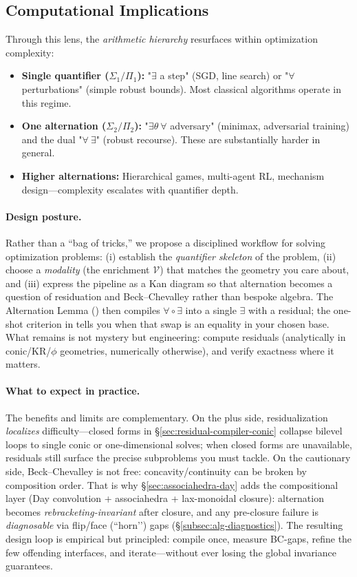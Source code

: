 \documentclass[11pt]{article}
\numberwithin{equation}{section}
\theoremstyle{upright}
\newcommand{\V}{\mathcal{V}}
\newcommand{\BC}{Beck--Chevalley}
\begin{document}
\subsection{Computational Implications}

Through this lens, the \emph{arithmetic hierarchy} resurfaces within optimization complexity:
\begin{itemize}[itemsep=0.5ex]
\item \textbf{Single quantifier ($\Sigma_1/\Pi_1$):} "$\exists$ a step" (SGD, line search) or "$\forall$ perturbations" (simple robust bounds). Most classical algorithms operate in this regime.
\item \textbf{One alternation ($\Sigma_2/\Pi_2$):} "$\exists\theta\ \forall$ adversary" (minimax, adversarial training) and the dual "$\forall\ \exists$" (robust recourse). These are substantially harder in general.
\item \textbf{Higher alternations:} Hierarchical games, multi-agent RL, mechanism design—complexity escalates with quantifier depth.
\end{itemize}

\paragraph{Design posture.}
Rather than a “bag of tricks,” we propose a disciplined workflow for solving optimization problems: (i) establish the \emph{quantifier skeleton} of the problem, (ii) choose a \emph{modality} (the enrichment $\V$) that matches the geometry you care about, and (iii) express the pipeline as a Kan diagram so that alternation becomes a question of residuation and \BC{} rather than bespoke algebra. The Alternation Lemma () then compiles $\forall\!\circ\!\exists$ into a single $\exists$ with a residual; the one-shot criterion in  tells you when that swap is an equality in your chosen base. What remains is not mystery but engineering: compute residuals (analytically in conic/KR/$\phi$ geometries, numerically otherwise), and verify exactness where it matters.

\paragraph{What to expect in practice.}
The benefits and limits are complementary. On the plus side, residualization \emph{localizes} difficulty—closed forms in \S\ref{sec:residual-compiler-conic} collapse bilevel loops to single conic or one-dimensional solves; when closed forms are unavailable, residuals still surface the precise subproblems you must tackle. On the cautionary side, \BC{} is not free: concavity/continuity can be broken by composition order. That is why \S\ref{sec:associahedra-day} adds the compositional layer (Day convolution + associahedra + lax-monoidal closure): alternation becomes \emph{rebracketing-invariant} after closure, and any pre-closure failure is \emph{diagnosable} via flip/face (“horn’’) gaps (\S\ref{subsec:alg-diagnostics}). The resulting design loop is empirical but principled: compile once, measure BC-gaps, refine the few offending interfaces, and iterate—without ever losing the global invariance guarantees.
\end{document}

